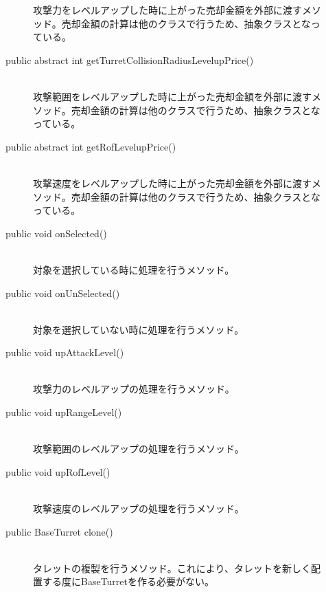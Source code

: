 \documentclass[11pt,a4j]{jarticle}
\begin{document}
\begin{description}
\begin{description}
                    攻撃力をレベルアップした時に上がった売却金額を外部に渡すメソッド。売却金額の計算は他のクラスで行うため、抽象クラスとなっている。
              \item[public abstract int getTurretCollisionRadiusLevelupPrice()]\mbox{}\\
                    攻撃範囲をレベルアップした時に上がった売却金額を外部に渡すメソッド。売却金額の計算は他のクラスで行うため、抽象クラスとなっている。
              \item[public abstract int getRofLevelupPrice()]\mbox{}\\
                    攻撃速度をレベルアップした時に上がった売却金額を外部に渡すメソッド。売却金額の計算は他のクラスで行うため、抽象クラスとなっている。
              \item[public void onSelected()]\mbox{}\\
                    対象を選択している時に処理を行うメソッド。
              \item[public void onUnSelected()]\mbox{}\\
                    対象を選択していない時に処理を行うメソッド。
              \item[public void upAttackLevel()]\mbox{}\\
                    攻撃力のレベルアップの処理を行うメソッド。
              \item[public void upRangeLevel()]\mbox{}\\
                    攻撃範囲のレベルアップの処理を行うメソッド。
              \item[public void upRofLevel()]\mbox{}\\
                    攻撃速度のレベルアップの処理を行うメソッド。
              \item[public BaseTurret clone()]\mbox{}\\
                    タレットの複製を行うメソッド。これにより、タレットを新しく配置する度にBaseTurretを作る必要がない。
          \end{description}
\end{description}
\end{document}
